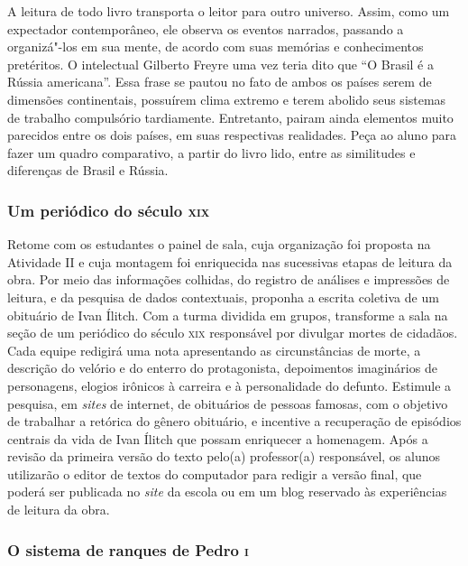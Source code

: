 \documentclass[12pt]{extarticle}
\begin{document}
A leitura de todo livro transporta o leitor para outro universo.
Assim, como um expectador contemporâneo, ele observa os eventos
narrados, passando a organizá"-los em sua mente, de acordo com suas
memórias e conhecimentos pretéritos. O intelectual Gilberto Freyre uma
vez teria dito que ``O Brasil é a Rússia americana''. Essa frase se
pautou no fato de ambos os países serem de dimensões continentais,
possuírem clima extremo e terem abolido seus sistemas de trabalho
compulsório tardiamente. Entretanto, pairam ainda elementos muito
parecidos entre os dois países, em suas respectivas realidades. Peça
ao aluno para fazer um quadro comparativo, a partir do livro lido,
entre as similitudes e diferenças de Brasil e Rússia.

\subsubsection{Um periódico do século \textsc{xix}}

Retome com os estudantes o painel de sala, cuja organização foi
proposta na Atividade II e cuja montagem foi enriquecida nas sucessivas
etapas de leitura da obra. Por meio das informações colhidas, do
registro de análises e impressões de leitura, e da pesquisa de dados
contextuais, proponha a escrita coletiva de um obituário de
Ivan Ílitch. Com a turma dividida em grupos, transforme a sala na
seção de um periódico do século \textsc{xix} responsável por divulgar mortes de
cidadãos. Cada equipe redigirá uma nota apresentando as circunstâncias
de morte, a descrição do velório e do enterro do protagonista,
depoimentos imaginários de personagens, elogios irônicos à carreira e
à personalidade do defunto. Estimule a pesquisa, em \emph{sites} de
internet, de obituários de pessoas famosas, com o objetivo de
trabalhar a retórica do gênero obituário, e incentive a
recuperação de episódios centrais da vida de Ivan Ílitch que possam
enriquecer a homenagem. Após a revisão da primeira versão do texto
pelo(a) professor(a) responsável, os alunos utilizarão o editor de
textos do computador para redigir a versão final, que poderá ser
publicada no \emph{site} da escola ou em um blog reservado às
experiências de leitura da obra.

\subsubsection{O sistema de ranques de Pedro \textsc{i}}
\end{document}

